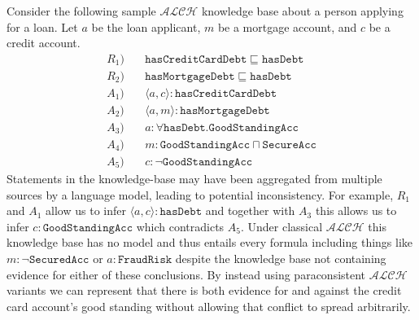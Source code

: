 \documentclass[letterpaper]{article} %
\theoremstyle{definition}
\theoremstyle{definition}
\theoremstyle{definition}
\theoremstyle{definition}
\theoremstyle{definition}
\begin{document}
Consider the following sample $\mathcal{ALCH}$ knowledge base about a person applying for a loan. Let $a$ be the loan applicant, $m$ be a mortgage account, and $c$ be a credit account.
\begin{align*}
R_1 ) \quad& \mathtt{hasCreditCardDebt} \sqsubseteq \mathtt{hasDebt}  \\
R_2) \quad& \mathtt{hasMortgageDebt} \sqsubseteq \mathtt{hasDebt} \\
A_1) \quad&\langle a,c \rangle : \mathtt{hasCreditCardDebt} \\
A_2) \quad&\langle a,m \rangle : \mathtt{hasMortgageDebt} \\
A_3) \quad&a:\forall \mathtt{hasDebt}.\mathtt{GoodStandingAcc} \\
A_4) \quad&m:\mathtt{GoodStandingAcc} \sqcap \mathtt{SecureAcc} \\
A_5) \quad&c : \lnot \mathtt{GoodStandingAcc}
\end{align*}
Statements in the knowledge-base may have been aggregated from multiple sources by a language model, leading to potential inconsistency. For example, $R_1$ and $A_1$ allow us to infer $\langle a,c\rangle : \mathtt{hasDebt} $ and together with $A_3$ this allows us to infer $c : \mathtt{GoodStandingAcc}$ which contradicts $A_5$. Under classical $\mathcal{ALCH}$ this knowledge base has no model and thus entails every formula including things like $m : \lnot \mathtt{SecuredAcc}$ or $a : \mathtt{FraudRisk}$ despite the knowledge base not containing evidence for either of these conclusions. By instead using paraconsistent $\mathcal{ALCH}$ variants we can represent that there is both evidence for and against the credit card account's good standing without allowing that conflict to spread arbitrarily.   




\end{document}
